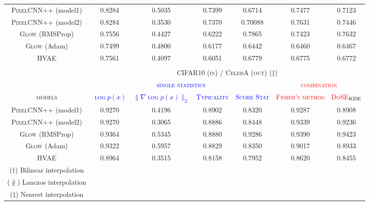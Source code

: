 {\begin{table}[tb]
{\begin{tabular}{ccccccc}
            \midrule
            \textsc{PixelCNN++} (model1)  &  0.8284  & 0.5035 & 0.7399 & 0.6714  & 0.7477 & 0.7123 \\
            \textsc{PixelCNN++} (model2) & 0.8284 & 0.3530 &   0.7370 & 0.70088 & 0.7631 & 0.7446\\
            \textsc{Glow} (RMSProp)  & 0.7556 & 0.4427 &  0.6222 & 0.7865  & 0.7423 & 0.7632 \\
            \textsc{Glow} (Adam)   & 0.7499 & 0.4800 &  0.6177 &  0.6442  &  0.6460 &  0.6467 \\
            \textsc{HVAE}  & 0.7561 &   0.4097 & 0.6051 &  0.6779 &  0.6775 &  0.6772  \\
            \bottomrule
             & & & & & & \\
            \toprule
            &\multicolumn{6}{c}{\textsc{CIFAR10 (in) / CelebA (out) ($\ddagger$)}}\\
            \cmidrule{2-7}
            & \multicolumn{4}{c}{\textcolor{blue}{\textsc{single statistics}}} & \multicolumn{2}{c}{\textcolor{red}{\textsc{combination}}}\\
            \cmidrule(r){2-5}\cmidrule(l){6-7}
            \textsc{models}  & \textcolor{blue}{\textsc{$\log p(x)$}} & \textcolor{blue}{\textsc{$\|\nabla \log p(x)\|_2$}} & \textcolor{blue}{\textsc{Typicality}} & \textcolor{blue}{\textsc{Score Stat}} & \textcolor{red}{\textsc{Fisher's method}} & \textcolor{red}{\textsc{DoSE$_{\textup{KDE}}$}} \\
            \midrule
            \textsc{PixelCNN++} (model1)  & 0.9270  & 0.4196 & 0.8902 &  0.8320 & 0.9287 &  0.8908 \\
            \textsc{PixelCNN++} (model2) & 0.9270 & 0.3065 & 0.8886 & 0.8448 & 0.9339 & 0.9236 \\
            \textsc{Glow} (RMSProp)  & 0.9364 & 0.5345 &  0.8880 & 0.9286  & 0.9390 & 0.9423 \\
            \textsc{Glow} (Adam)   &  0.9322 & 0.5957 & 0.8829  &  0.8350  & 0.9017 &  0.8933 \\
            \textsc{HVAE}  & 0.8964 & 0.3515  & 0.8158 & 0.7952 &  0.8620 &   0.8455 \\
            \bottomrule
            ($\dagger$) Bilinear interpolation \\
            ($\nparallel$) Lanczos interpolation \\
            ($\ddagger$) Nearest interpolation\\
        \end{tabular}
        \label{table:celeba}
    }
    \vspace*{-\baselineskip}
\end{table}


}
